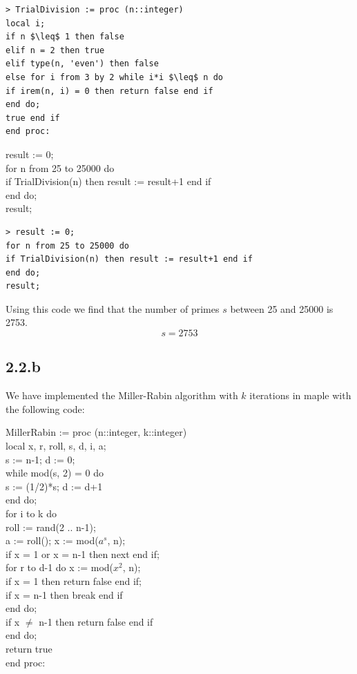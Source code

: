 \documentclass[11pt]{report}
\begin{document}
\begin{lstlisting}[style=Maple]
> TrialDivision := proc (n::integer)
local i;
if n $\leq$ 1 then false
elif n = 2 then true
elif type(n, 'even') then false
else for i from 3 by 2 while i*i $\leq$ n do
if irem(n, i) = 0 then return false end if
end do;
true end if
end proc:
\end{lstlisting}

\begin{mapleinput}
result := 0; \\
for n from 25 to 25000 do \\
if TrialDivision(n) then result := result+1 end if \\
end do; \\
result;
\end{mapleinput}

\begin{lstlisting}[style=Maple]
> result := 0;
for n from 25 to 25000 do
if TrialDivision(n) then result := result+1 end if
end do;
result;
\end{lstlisting}

Using this code we find that the number of primes $s$ between 25 and 25000 is 2753.
$$s = 2753$$

\subsection*{2.2.b}
We have implemented the Miller-Rabin algorithm with $k$ iterations in maple with the following code:
\begin{mapleinput}
MillerRabin := proc (n::integer, k::integer) \\
local x, r, roll, s, d, i, a; \\
s := n-1; d := 0; \\
while mod(s, 2) = 0 do \\
s := (1/2)*s; d := d+1 \\
end do; \\
for i to k do \\
roll := rand(2 .. n-1); \\
a := roll(); x := mod($a^s$, n); \\
if x = 1 or x = n-1 then next end if; \\
for r to d-1 do x := mod($x^2$, n); \\
if x = 1 then return false end if; \\
if x = n-1 then break end if \\
end do; \\
if x $\ne$ n-1 then return false end if \\
end do; \\
return true \\
end proc:
\end{mapleinput}
\end{document}
